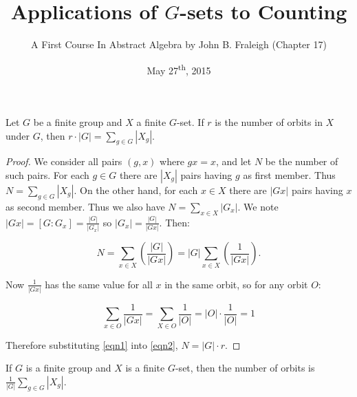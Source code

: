 \documentclass[a4paper,8pt]{article}
\title{Applications of \(G\)-sets to Counting}
\author{A First Course In Abstract Algebra by John B. Fraleigh (Chapter 17)}
\date{May 27\textsuperscript{th}, 2015}
\begin{document}
\maketitle
{}

\begin{outline}

    Let \(G\) be a finite group and \(X\) a finite \(G\)-set. If \(r\) is the number of orbits in \(X\)
    under \(G\), then \(r \cdot |G| = \sum_{g \in G}|X_g|\).

    \begin{proof}
      We consider all pairs \((g, x)\) where \(gx = x\), and let \(N\) be the number of such pairs. For each
      \(g \in G\) there are \(|X_g|\) pairs having \(g\) as first member. Thus \(N = \sum_{g \in G}|X_g|\).
      On the other hand, for each \(x \in X\) there are \(|Gx|\) pairs having \(x\) as second member. Thus we also
      have \(N = \sum_{x \in X} |G_x|\). We note \(|Gx| = [G:G_x] = \frac{|G|}{|G_x|}\) so \(|G_x| = \frac{|G|}{|Gx|}\).
      Then:

      \begin{equation}
        \label{eqn1}
        N = \sum_{x \in X}(\frac{|G|}{|Gx|}) = |G|\sum_{x \in X} (\frac{1}{|Gx|}).
      \end{equation}

      Now \(\frac{1}{|Gx|}\) has the same value for all \(x\) in the same orbit, so for any orbit \(O\):

      \begin{equation}
        \label{eqn2}
        \sum_{x \in O} \frac{1}{|Gx|} = \sum_{X \in O} \frac{1}{|O|} = |O| \cdot \frac{1}{|O|} = 1
      \end{equation}

      Therefore substituting \eqref{eqn1} into \eqref{eqn2}, \(N = |G| \cdot r\).
    \end{proof}

    If \(G\) is a finite group and \(X\) is a finite \(G\)-set, then the number of orbits is
    \(\frac{1}{|G|}\sum_{g \in G}|X_g|\).

\end{outline}
\end{document}
